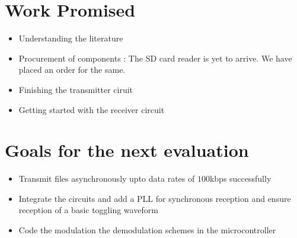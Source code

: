 \documentclass{article}
\begin{document}
\section{Work Promised}

\begin{itemize}
\item Understanding the literature
\item Procurement of components : The SD card reader is yet to arrive. We have placed an order for the same.
\item Finishing the transmitter ciruit
\item Getting started with the receiver circuit
\end{itemize}

\section{Goals for the next evaluation}

\begin{itemize}
\item Transmit files asynchronously upto data rates of $100$kbps successfully
\item Integrate the circuits and add a PLL for synchronous reception and ensure reception of a basic toggling waveform
\item Code the modulation the demodulation schemes in the microcontroller
\end{itemize}






\end{document}
